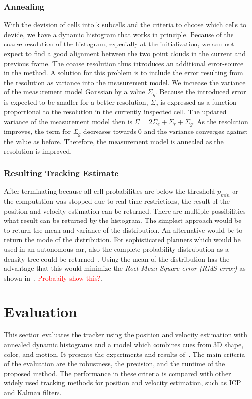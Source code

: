\documentclass[twoside,a4paper,article]{combine}
\begin{document}
\subsubsection{Annealing}
\label{sub:annealing}
With the devision of cells into k subcells and the criteria to choose
which cells to devide, we have a dynamic histogram that works in
principle. Because of the coarse resolution of the histogram,
especially at the initialization, we can not expect to find a good
alignment between the two point clouds in the current and previous
frame. The coarse resolution thus introduces an additional
error-source in the method. A solution for this problem is to include
the error resulting from the resolution as variance into the
measurement model. We increase the variance of the measurement model
Gaussian by a value $\Sigma_g$. Because the introduced error is
expected to be smaller for a better resolution, $\Sigma_g$ is
expressed as a function proportional to the resolution in the
currently inspected cell. The updated variance of the measurement
model then is $\Sigma = 2\Sigma_e+\Sigma_r+\Sigma_g$. As the
resolution improves, the term for $\Sigma_g$ decreases towards $0$ and
the variance converges against the value as before. Therefore, the
measurement model is annealed as the resolution is improved.


\subsubsection{Resulting Tracking Estimate}
\label{sub:adh-resulting}
After terminating because all cell-probabilities are below the
threshold $p_{min}$ or the computation was stopped due to real-time
restrictions, the result of the position and velocity estimation can
be returned. There are multiple possibilities what result can be
returned by the histogram. The simplest approach would be to return
the mean and variance of the distribution. An alternative would be to
return the mode of the distribution. For sophisticated planners which
would be used in an autonomous car, also the complete probability
distrubution as a density tree could be returned~\cite{density-tree}.
Using the mean of the distribution has the advantage that this would
minimize the \textit{Root-Mean-Square error (RMS error)} as shown
in~\cite{paper}. \textcolor{red}{Probabily show this?}.

\section{Evaluation}
\label{sec:evaluation}
This section evaluates the tracker using the position and velocity
estimation with annealed dynamic histograms and a model which combines
cues from 3D shape, color, and motion. It presents the experiments and
results of~\cite{paper}. The main criteria of the evaluation are the
robustness, the precision, and the runtime of the proposed
method. The performance in these criteria is compared with other
widely used tracking methods for position and velocity estimation,
such as ICP and Kalman filters.
\end{document}
